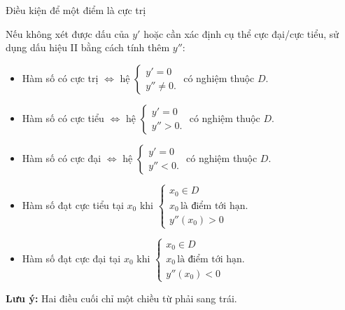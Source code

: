 \begin{lythuyetbox}{Điều kiện để một điểm là cực trị}
\begin{enumerate}
\begin{itemize}
        Nếu không xét được dấu của $y'$ hoặc cần xác định cụ thể cực đại/cực tiểu, sử dụng dấu hiệu II bằng cách tính thêm $y''$:
        \begin{itemize}
            \item Hàm số có cực trị $\Leftrightarrow$ hệ $\left\{ \begin{array}{l} y' = 0 \\ y'' \neq 0. \end{array} \right.$ có nghiệm thuộc $D$.
            \item Hàm số có cực tiểu $\Leftrightarrow$ hệ $\left\{ \begin{array}{l} y' = 0 \\ y'' > 0. \end{array} \right.$ có nghiệm thuộc $D$.
            \item Hàm số có cực đại $\Leftrightarrow$ hệ $\left\{ \begin{array}{l} y' = 0 \\ y'' < 0. \end{array} \right.$ có nghiệm thuộc $D$.
            \item Hàm số đạt cực tiểu tại $x_0$ khi $\left\{ \begin{array}{l} x_0 \in D \\ x_0 \,\text{là điểm tới hạn.} \\ y''(x_0) > 0 \end{array} \right.$
            \item Hàm số đạt cực đại tại $x_0$ khi $\left\{ \begin{array}{l} x_0 \in D \\ x_0 \,\text{là điểm tới hạn.} \\ y''(x_0) < 0 \end{array} \right.$
        \end{itemize}

        \textbf{Lưu ý:} Hai điều cuối chỉ một chiều từ phải sang trái.
    \end{itemize}
\end{enumerate}
\end{lythuyetbox}

